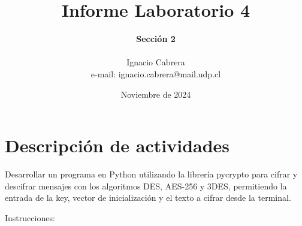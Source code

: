 \documentclass[letter,12pt]{article}
\begin{document}
%
   \title{\Huge{Informe Laboratorio 4}}

   \author{\textbf{Sección 2} \\  \\Ignacio Cabrera \\ e-mail: ignacio.cabrera@mail.udp.cl}
          
   \date{Noviembre de 2024}

   \maketitle
   
   \tableofcontents
 
  \newpage
  

\section{Descripción de actividades}
Desarrollar un programa en Python utilizando la librería pycrypto para cifrar y descifrar mensajes con los algoritmos DES, AES-256 y 3DES, permitiendo la entrada de la key, vector de inicialización y el texto a cifrar desde la terminal. 

Instrucciones:
\end{document}

